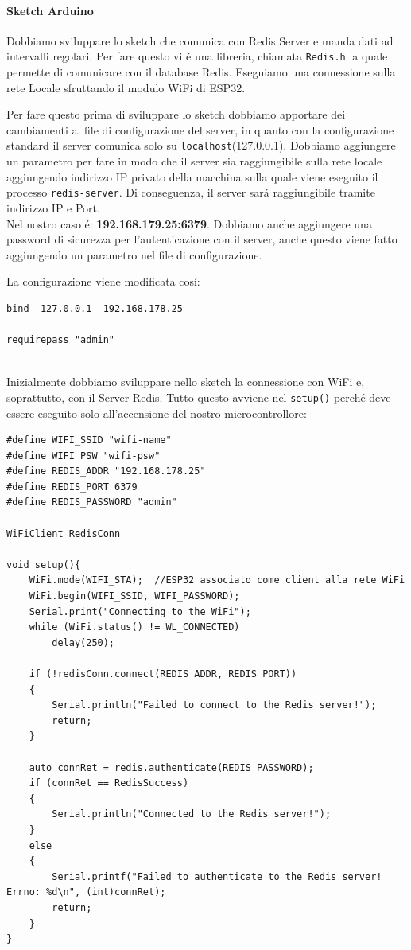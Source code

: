 \paragraph{Sketch Arduino\\}
Dobbiamo sviluppare lo sketch che comunica con Redis Server e manda dati ad intervalli regolari.
Per fare questo vi é una libreria, chiamata \texttt{Redis.h} la quale permette di comunicare con il database Redis.
Eseguiamo una connessione sulla rete Locale sfruttando il modulo WiFi di ESP32.

Per fare questo prima di sviluppare lo sketch dobbiamo apportare dei cambiamenti al file di configurazione del server,
in quanto con la configurazione standard il server comunica solo su \texttt{localhost}(127.0.0.1).
Dobbiamo aggiungere un parametro per fare in modo che il server sia raggiungibile sulla rete locale aggiungendo indirizzo IP
privato della macchina sulla quale viene eseguito il processo \texttt{redis-server}.
Di conseguenza, il server sará raggiungibile tramite indirizzo IP e Port.\\
Nel nostro caso é: \textbf{192.168.179.25:6379}.
Dobbiamo anche aggiungere una password di sicurezza per l'autenticazione con il server, anche questo viene fatto
aggiungendo un parametro nel file di configurazione.

La configurazione viene modificata cosí:
\begin{lstlisting}[autogobble]
bind  127.0.0.1  192.168.178.25

requirepass "admin"\end{lstlisting}

 \\

Inizialmente dobbiamo sviluppare nello sketch la connessione con WiFi e, soprattutto, con il Server Redis.
Tutto questo avviene nel \texttt{setup()} perché deve essere eseguito solo all'accensione del nostro microcontrollore:
\begin{lstlisting}[autogobble]
#define WIFI_SSID "wifi-name"
#define WIFI_PSW "wifi-psw"
#define REDIS_ADDR "192.168.178.25"
#define REDIS_PORT 6379
#define REDIS_PASSWORD "admin"

WiFiClient RedisConn

void setup(){
    WiFi.mode(WIFI_STA);  //ESP32 associato come client alla rete WiFi
    WiFi.begin(WIFI_SSID, WIFI_PASSWORD);
    Serial.print("Connecting to the WiFi");
    while (WiFi.status() != WL_CONNECTED)
        delay(250);

    if (!redisConn.connect(REDIS_ADDR, REDIS_PORT))
    {
        Serial.println("Failed to connect to the Redis server!");
        return;
    }

    auto connRet = redis.authenticate(REDIS_PASSWORD);
    if (connRet == RedisSuccess)
    {
        Serial.println("Connected to the Redis server!");
    }
    else
    {
        Serial.printf("Failed to authenticate to the Redis server! Errno: %d\n", (int)connRet);
        return;
    }
}
\end{lstlisting}

